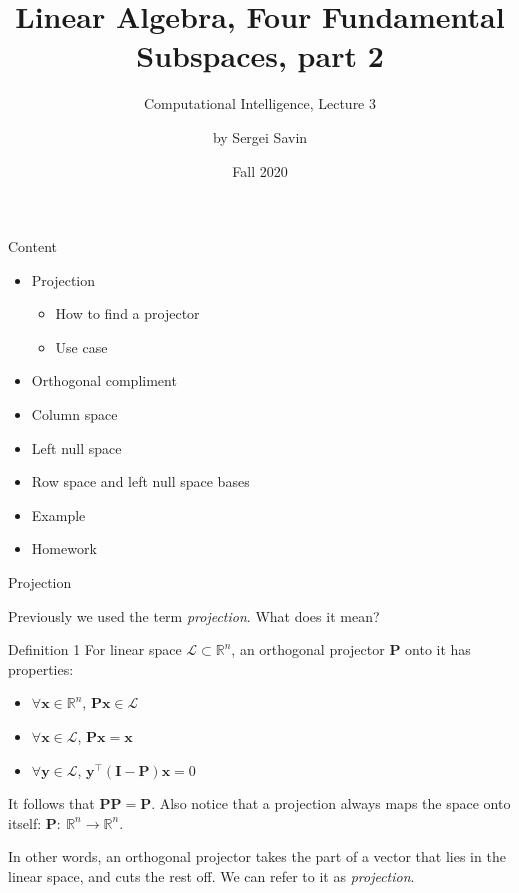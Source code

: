 \documentclass{beamer}
\title{Linear Algebra, Four Fundamental Subspaces, part 2}
\subtitle{Computational Intelligence, Lecture 3}
\author{by Sergei Savin}
\date{Fall 2020}
\begin{document}
\maketitle


\begin{frame}{Content}

\begin{itemize}
\item Projection
\begin{itemize}
\item How to find a projector
\item Use case
\end{itemize}
\item Orthogonal compliment
\item Column space
\item Left null space
\item Row space and left null space bases
\item Example
\item Homework
\end{itemize}

\end{frame}

\begin{frame}{Projection}
\begin{flushleft}

Previously we used the term \emph{projection}. What does it mean? 

\begin{block}{Definition 1}
For linear space $\mathcal{L} \subset \mathbb{R}^n$, an orthogonal projector $\mathbf{P}$ onto it has properties: 
\begin{itemize}
    \item $\forall \mathbf{x} \in \mathbb{R}^n$, $\mathbf{P}\mathbf{x} \in \mathcal{L}$
    \item $\forall \mathbf{x} \in \mathcal{L}$, $\mathbf{P}\mathbf{x} = \mathbf{x}$
    \item $\forall \mathbf{y} \in \mathcal{L}$, $\mathbf{y}^\top (\mathbf{I} - \mathbf{P}) \mathbf{x} = 0$
\end{itemize}
\end{block}

\bigskip

It follows that $\mathbf{P}\mathbf{P} = \mathbf{P}$. Also notice that a projection always maps the space onto itself: $\mathbf{P}: \ \mathbb{R}^n \rightarrow \mathbb{R}^n$.

\bigskip

In other words, an orthogonal projector takes the part of a vector that lies in the linear space, and cuts the rest off. We can refer to it as \emph{projection}.

\end{flushleft}
\end{frame}
\end{document}
